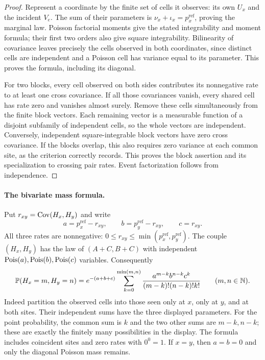 \begin{proof}
Represent a coordinate by the finite set of cells it observes: its
own $U_x$ and the incident $V_e$. The sum of their parameters is
$\nu_x+\iota_x=p_x^{\mathrm{ref}}$, proving the marginal law.
Poisson factorial moments give the stated integrability and moment
formula; their first two orders also give square integrability.
Bilinearity of covariance leaves precisely the cells observed in
both coordinates, since distinct cells are independent and a Poisson
cell has variance equal to its parameter. This proves the formula,
including its diagonal.

For two blocks, every cell observed on both sides contributes its
nonnegative rate to at least one cross covariance. If all those
covariances vanish, every shared cell has rate zero and vanishes
almost surely. Remove these cells simultaneously from the finite
block vectors. Each remaining vector is a measurable function of a
disjoint subfamily of independent cells, so the whole vectors are
independent. Conversely, independent square-integrable block vectors
have zero cross covariance. If the blocks overlap, this also requires
zero variance at each common site, as the criterion correctly records.
This proves the block assertion and its specialization to crossing
pair rates. Event factorization follows from independence.
\end{proof}

\paragraph{The bivariate mass formula.}
\label{p18:limits:bivariate-reference}
Put $r_{xy}=\Cov(H_x,H_y)$ and write
\[
 a=p_x^{\mathrm{ref}}-r_{xy},\qquad
 b=p_y^{\mathrm{ref}}-r_{xy},\qquad c=r_{xy}.
\]
All three rates are nonnegative:
$0\le r_{xy}\le\min(p_x^{\mathrm{ref}},p_y^{\mathrm{ref}})$.
The couple $(H_x,H_y)$ has the law of $(A+C,B+C)$ with independent
$\Pois(a),\Pois(b),\Pois(c)$ variables. Consequently
\[
 \P(H_x=m,H_y=n)
 =e^{-(a+b+c)}\sum_{k=0}^{\min(m,n)}
       \frac{a^{m-k}b^{n-k}c^k}{(m-k)!(n-k)!k!}
 \qquad(m,n\in\mathbb N).
\]
Indeed partition the observed cells into those seen only at $x$,
only at $y$, and at both sites. Their independent sums have the
three displayed parameters. For the point probability, the common
sum is $k$ and the two other sums are $m-k,n-k$; these are exactly
the finitely many possibilities in the display. The formula includes
coincident sites and zero rates with $0^0=1$. If $x=y$, then
$a=b=0$ and only the diagonal Poisson mass remains.

